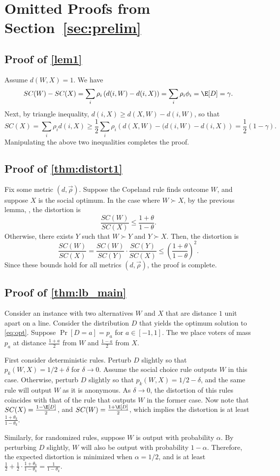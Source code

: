 \section{Omitted Proofs from Section~\ref{sec:prelim}}
\label{app:omitted}

\subsection{Proof of \cref{lem1}}
Assume $d(W,X) = 1$. We have 
$$SC(W) - SC(X) = \sum_i \rho_i \left(d(i,W) - d(i,X) \right) = \sum_i \rho_i \phi_i = \E[D] = \gamma. $$
Next, by triangle inequality, $d(i,X) \ge d(X,W) - d(i,W)$, so that
$$ SC(X) = \sum_i \rho_i d(i,X) \ge \frac{1}{2} \sum_i \rho_i \left(d(X,W) - (d(i,W) - d(i,X) \right) = \frac{1}{2} \left(1 - \gamma \right). $$
Manipulating the above two inequalities completes the proof.

\subsection{Proof of \cref{thm:distort1}}

    Fix some metric $(d,\vec{\rho})$. Suppose the Copeland rule finds outcome $W$, and suppose $X$ is the social optimum. In the case where $W \succ X$, by the previous lemma, , the distortion is 
    $$\frac{SC(W)}{SC(X)} \le \frac{1 + \theta}{1-\theta}.$$ 
    Otherwise, there exists $Y$ such that $W \succ Y$ and $Y \succ X$. Then, the distortion is 
    $$ \frac{SC(W)}{SC(X)} = \frac{SC(W)}{SC(Y)} \cdot \frac{SC(Y)}{SC(X)} \le  \left( \frac{1 + \theta}{1-\theta}\right)^2. $$
    Since these bounds hold for all metrics $(d,\vec{\rho})$, the proof is complete.

\subsection{Proof of \cref{thm:lb_main}}
Consider an instance with two alternatives $W$ and $X$ that are distance $1$ unit apart on a line. Consider the distribution $D$ that yields the optimum solution to \cref{eq:opt}. Suppose $\Pr[D = a] = p_a$ for $a \in [-1,1]$. The we place voters of mass $p_a$ at distance $\frac{1+a}{2}$ from $W$ and $\frac{1-a}{2}$ from $X$.

First consider deterministic rules. Perturb $D$ slightly so that $p_k(W,X) = 1/2 + \delta$ for  $\delta \rightarrow 0$. Assume the social choice rule outputs $W$ in this case. Otherwise, perturb $D$ slightly so that $p_k(W,X) = 1/2 - \delta$, and the same rule will output $W$ as it is anonymous. As $\delta \rightarrow 0$, the distortion of this rules coincides with that of the rule that outputs $W$ in the former case. Now note that $SC(X) = \frac{1 - \E[D]}{2}$, and $SC(W) = \frac{1 + \E[D]}{2}$, which implies the distortion is at least  $\frac{1+\theta_k}{1-\theta_k}$.

Similarly, for randomized rules, suppose $W$ is output with probability $\alpha$. By perturbing $D$ slightly, $W$ will also be output with probability $1-\alpha$. Therefore, the  expected distortion is minimized when $\alpha = 1/2$, and is at least 
$\frac{1}{2} + \frac{1}{2} \cdot \frac{1+\theta_k}{1-\theta_k} = \frac{1}{1-\theta_k}.$

